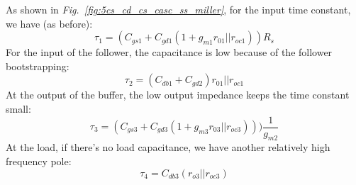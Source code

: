 \noindent As shown in \emph{Fig.~\ref{fig:5cs_cd_cs_casc_ss_miller}}, for the input time constant, we have (as before):   
    \begin{equation} 
        \tau_1 = (C_{gs1} + C_{gd1} (1 + g_{m1} r_{01}||r_{oc1})) R_s 
    \end{equation}
For the input of the follower, the capacitance is low because of the follower bootstrapping:
    \begin{equation} 
        \tau_2 = (C_{db1} + C_{gd2} ) r_{01}||r_{oc1} 
    \end{equation}
At the output of the buffer, the low output impedance keeps the time constant small:
    \begin{equation}  
        \tau_3 = (C_{gs3} + C_{gd3} (1 + g_{m3} r_{03}||r_{oc3}))) \frac{1}{g_{m2}} 
    \end{equation}
At the load, if there's no load capacitance, we have another relatively high frequency pole:
    \begin{equation}  
        \tau_4 = C_{db3} (r_{o3} || r_{oc3})
    \end{equation}
\section{\topicC}
